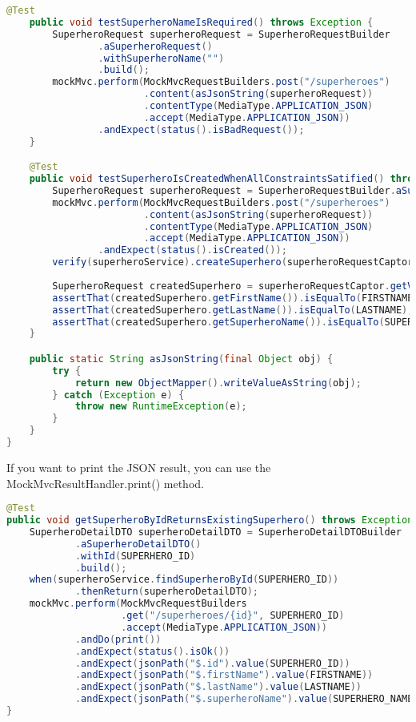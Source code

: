 \begin{lstlisting}[language=java, frame=single]
	@Test
	public void testSuperheroNameIsRequired() throws Exception {
		SuperheroRequest superheroRequest = SuperheroRequestBuilder
				.aSuperheroRequest()
				.withSuperheroName("")
				.build();
		mockMvc.perform(MockMvcRequestBuilders.post("/superheroes")
						.content(asJsonString(superheroRequest))
						.contentType(MediaType.APPLICATION_JSON)
						.accept(MediaType.APPLICATION_JSON))
				.andExpect(status().isBadRequest());
	}

	@Test
	public void testSuperheroIsCreatedWhenAllConstraintsSatified() throws Exception {
		SuperheroRequest superheroRequest = SuperheroRequestBuilder.aSuperheroRequest().build();
		mockMvc.perform(MockMvcRequestBuilders.post("/superheroes")
						.content(asJsonString(superheroRequest))
						.contentType(MediaType.APPLICATION_JSON)
						.accept(MediaType.APPLICATION_JSON))
				.andExpect(status().isCreated());
		verify(superheroService).createSuperhero(superheroRequestCaptor.capture());
		
		SuperheroRequest createdSuperhero = superheroRequestCaptor.getValue();
		assertThat(createdSuperhero.getFirstName()).isEqualTo(FIRSTNAME);
		assertThat(createdSuperhero.getLastName()).isEqualTo(LASTNAME);
		assertThat(createdSuperhero.getSuperheroName()).isEqualTo(SUPERHERO_NAME);
	}

	public static String asJsonString(final Object obj) {
		try {
			return new ObjectMapper().writeValueAsString(obj);
		} catch (Exception e) {
			throw new RuntimeException(e);
		}
	}
}

\end{lstlisting}

If you want to print the JSON result, you can use the MockMvcResultHandler.print() method.

\begin{lstlisting}[language=java, frame=single]
@Test
public void getSuperheroByIdReturnsExistingSuperhero() throws Exception {
	SuperheroDetailDTO superheroDetailDTO = SuperheroDetailDTOBuilder
			.aSuperheroDetailDTO()
			.withId(SUPERHERO_ID)
			.build();
	when(superheroService.findSuperheroById(SUPERHERO_ID))
			.thenReturn(superheroDetailDTO);
	mockMvc.perform(MockMvcRequestBuilders
					.get("/superheroes/{id}", SUPERHERO_ID)
					.accept(MediaType.APPLICATION_JSON))
			.andDo(print())
			.andExpect(status().isOk())
			.andExpect(jsonPath("$.id").value(SUPERHERO_ID))
			.andExpect(jsonPath("$.firstName").value(FIRSTNAME))
			.andExpect(jsonPath("$.lastName").value(LASTNAME))
			.andExpect(jsonPath("$.superheroName").value(SUPERHERO_NAME));
}
\end{lstlisting}
	
